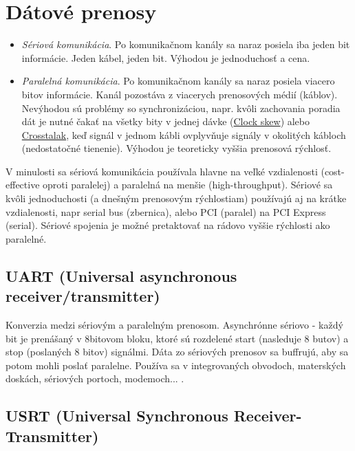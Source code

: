 \documentclass[10pt,a4paper]{article}
\begin{document}
\section{Dátové prenosy}     
\begin{itemize}
\item \emph{Sériová komunikácia}. Po komunikačnom kanály sa naraz posiela iba jeden bit informácie. Jeden kábel, jeden bit. Výhodou je jednoduchosť a cena. 
\item \emph{Paralelná komunikácia}. 
Po komunikačnom kanály sa naraz posiela viacero bitov informácie. 
Kanál pozostáva z viacerych prenosových médií (káblov). 
Nevýhodou sú problémy so synchronizáciou, napr. kvôli zachovania poradia dát je nutné čakať na všetky bity v jednej dávke (\href{http://en.wikipedia.org/wiki/Clock_skew}{Clock skew}) 
alebo \href{http://en.wikipedia.org/wiki/Crosstalk}{Crosstalak}, keď signál v jednom kábli ovplyvňuje signály v okolitých kábloch (nedostatočné tienenie). 
Výhodou je teoreticky vyššia prenosová rýchlosť. 
\end{itemize}

V minulosti sa sériová komunikácia používala hlavne na veľké vzdialenosti (cost-effective oproti paralelej) 
a paralelná na menšie (high-throughput). 
Sériové sa kvôli jednoduchosti (a dnešným prenosovým rýchlostiam) používajú aj na krátke vzdialenosti, napr serial bus (zbernica), alebo PCI (paralel) na PCI Express (serial). 
Sériové spojenia je možné pretaktovať na rádovo vyššie rýchlosti ako paralelné.  

\subsection{UART (Universal asynchronous receiver/transmitter)} 

Konverzia medzi sériovým a paralelným prenosom.
Asynchrónne sériovo - každý bit je prenášaný v 8bitovom bloku, ktoré sú rozdelené start (nasleduje 8 butov) a stop (poslaných 8 bitov) signálmi.
Dáta zo sériových prenosov sa buffrujú, aby sa potom mohli poslať paralelne. 
Používa sa v integrovaných obvodoch, materských doskách, sériových portoch, modemoch... .       
       
\subsection{USRT (Universal Synchronous Receiver-Transmitter)}   
\end{document}
